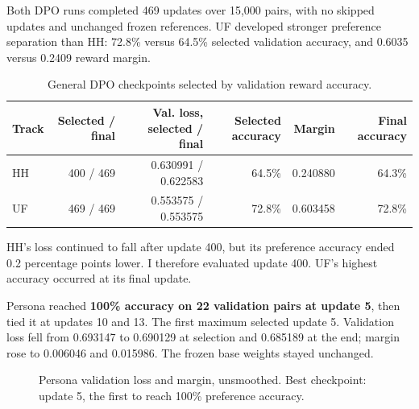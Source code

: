 \documentclass[11pt,a4paper]{article}
\begin{document}
Both DPO runs completed 469 updates over 15,000 pairs, with no skipped updates and unchanged frozen references. UF developed stronger preference separation than HH: 72.8\% versus 64.5\% selected validation accuracy, and 0.6035 versus 0.2409 reward margin.
\begin{table}[H]
\centering\small
\begin{tabular}{@{}lrrrrr@{}}\toprule
Track & Selected / final & Val. loss, selected / final & Selected accuracy & Margin & Final accuracy\\\midrule
HH & 400 / 469 & 0.630991 / 0.622583 & 64.5\% & 0.240880 & 64.3\%\\
UF & 469 / 469 & 0.553575 / 0.553575 & 72.8\% & 0.603458 & 72.8\%\\\bottomrule
\end{tabular}
\caption{General DPO checkpoints selected by validation reward accuracy.}
\end{table}
HH's loss continued to fall after update 400, but its preference accuracy ended 0.2 percentage points lower. I therefore evaluated update 400. UF's highest accuracy occurred at its final update.

Persona reached \textbf{100\% accuracy on 22 validation pairs at update 5}, then tied it at updates 10 and 13. The first maximum selected update 5. Validation loss fell from 0.693147 to 0.690129 at selection and 0.685189 at the end; margin rose to 0.006046 and 0.015986. The frozen base weights stayed unchanged.

\begin{figure}[!ht]
\centering
{}
\caption{Persona validation loss and margin, unsmoothed. Best checkpoint: update 5, the first to reach 100\% preference accuracy.}
\label{fig:persona}
\end{figure}
\end{document}
